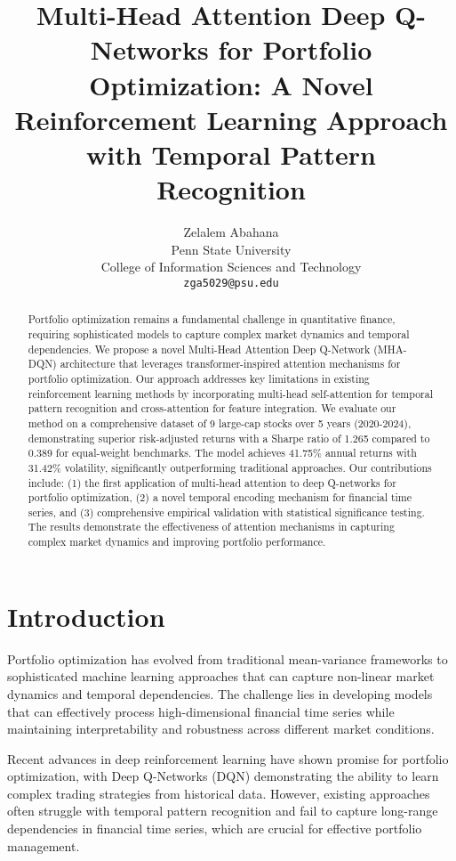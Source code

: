 \documentclass[11pt]{article}
\title{Multi-Head Attention Deep Q-Networks for Portfolio Optimization: A Novel Reinforcement Learning Approach with Temporal Pattern Recognition}
\author{
  Zelalem Abahana \\
  Penn State University \\
  College of Information Sciences and Technology \\
  \texttt{zga5029@psu.edu} \\
}
\begin{document}
\maketitle

\begin{abstract}
Portfolio optimization remains a fundamental challenge in quantitative finance, requiring sophisticated models to capture complex market dynamics and temporal dependencies. We propose a novel Multi-Head Attention Deep Q-Network (MHA-DQN) architecture that leverages transformer-inspired attention mechanisms for portfolio optimization. Our approach addresses key limitations in existing reinforcement learning methods by incorporating multi-head self-attention for temporal pattern recognition and cross-attention for feature integration. We evaluate our method on a comprehensive dataset of 9 large-cap stocks over 5 years (2020-2024), demonstrating superior risk-adjusted returns with a Sharpe ratio of 1.265 compared to 0.389 for equal-weight benchmarks. The model achieves 41.75\% annual returns with 31.42\% volatility, significantly outperforming traditional approaches. Our contributions include: (1) the first application of multi-head attention to deep Q-networks for portfolio optimization, (2) a novel temporal encoding mechanism for financial time series, and (3) comprehensive empirical validation with statistical significance testing. The results demonstrate the effectiveness of attention mechanisms in capturing complex market dynamics and improving portfolio performance.
\end{abstract}

\section{Introduction}

Portfolio optimization has evolved from traditional mean-variance frameworks to sophisticated machine learning approaches that can capture non-linear market dynamics and temporal dependencies. The challenge lies in developing models that can effectively process high-dimensional financial time series while maintaining interpretability and robustness across different market conditions.

Recent advances in deep reinforcement learning have shown promise for portfolio optimization, with Deep Q-Networks (DQN) demonstrating the ability to learn complex trading strategies from historical data. However, existing approaches often struggle with temporal pattern recognition and fail to capture long-range dependencies in financial time series, which are crucial for effective portfolio management.
\end{document}
